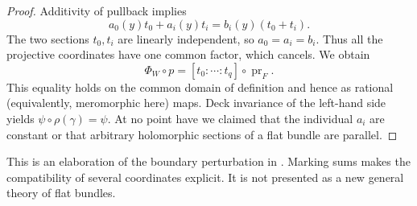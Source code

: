 \documentclass[12pt]{amsart}
\theoremstyle{definition}
\theoremstyle{remark}
\numberwithin{equation}{section}
\DeclareMathOperator{\pr}{pr}
\begin{document}
\begin{proof}
Additivity of pullback implies
\[
 a_0(y)t_0+a_i(y)t_i=b_i(y)(t_0+t_i).
\]
The two sections $t_0,t_i$ are linearly independent, so $a_0=a_i=b_i$. Thus all the projective coordinates have one common factor, which cancels. We obtain
\[
 \Phi_W\circ p=[t_0:\cdots:t_q]\circ\pr_F.
\]
This equality holds on the common domain of definition and hence as rational (equivalently, meromorphic here) maps. Deck invariance of the left-hand side yields $\psi\circ\rho(\gamma)=\psi$. At no point have we claimed that the individual $a_i$ are constant or that arbitrary holomorphic sections of a flat bundle are parallel.
\end{proof}

This is an elaboration of the boundary perturbation in \cite[proof of Theorem 1.6, Step 3]{en:EIM}. Marking sums makes the compatibility of several coordinates explicit. It is not presented as a new general theory of flat bundles.
\end{document}
